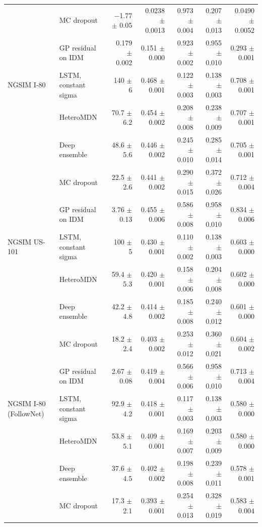 \begin{table}[htbp]
\begin{tabular}{llrrrrr}
 & MC dropout & $-$1.77 $\pm$ 0.05 & 0.0238 $\pm$ 0.0013 & 0.973 $\pm$ 0.004 & 0.207 $\pm$ 0.013 & 0.0490 $\pm$ 0.0052 \\
 & GP residual on IDM & 0.179 $\pm$ 0.002 & 0.151 $\pm$ 0.000 & 0.923 $\pm$ 0.002 & 0.955 $\pm$ 0.010 & 0.293 $\pm$ 0.001 \\
\midrule
NGSIM I-80 & LSTM, constant sigma & 140 $\pm$ 6 & 0.468 $\pm$ 0.001 & 0.122 $\pm$ 0.003 & 0.138 $\pm$ 0.003 & 0.708 $\pm$ 0.001 \\
 & HeteroMDN & 70.7 $\pm$ 6.2 & 0.454 $\pm$ 0.002 & 0.208 $\pm$ 0.008 & 0.238 $\pm$ 0.009 & 0.707 $\pm$ 0.001 \\
 & Deep ensemble & 48.6 $\pm$ 5.6 & 0.446 $\pm$ 0.002 & 0.245 $\pm$ 0.010 & 0.285 $\pm$ 0.014 & 0.705 $\pm$ 0.001 \\
 & MC dropout & 22.5 $\pm$ 2.6 & 0.441 $\pm$ 0.002 & 0.290 $\pm$ 0.015 & 0.372 $\pm$ 0.026 & 0.712 $\pm$ 0.004 \\
 & GP residual on IDM & 3.76 $\pm$ 0.13 & 0.455 $\pm$ 0.006 & 0.586 $\pm$ 0.008 & 0.958 $\pm$ 0.010 & 0.834 $\pm$ 0.006 \\
\midrule
NGSIM US-101 & LSTM, constant sigma & 100 $\pm$ 5 & 0.430 $\pm$ 0.001 & 0.110 $\pm$ 0.002 & 0.138 $\pm$ 0.003 & 0.603 $\pm$ 0.000 \\
 & HeteroMDN & 59.4 $\pm$ 5.3 & 0.420 $\pm$ 0.001 & 0.158 $\pm$ 0.006 & 0.204 $\pm$ 0.008 & 0.602 $\pm$ 0.000 \\
 & Deep ensemble & 42.2 $\pm$ 4.8 & 0.414 $\pm$ 0.002 & 0.185 $\pm$ 0.008 & 0.240 $\pm$ 0.012 & 0.601 $\pm$ 0.000 \\
 & MC dropout & 18.2 $\pm$ 2.4 & 0.403 $\pm$ 0.002 & 0.253 $\pm$ 0.012 & 0.360 $\pm$ 0.021 & 0.604 $\pm$ 0.002 \\
 & GP residual on IDM & 2.67 $\pm$ 0.08 & 0.419 $\pm$ 0.004 & 0.566 $\pm$ 0.006 & 0.958 $\pm$ 0.010 & 0.713 $\pm$ 0.004 \\
\midrule
NGSIM I-80 (FollowNet) & LSTM, constant sigma & 92.9 $\pm$ 4.2 & 0.418 $\pm$ 0.001 & 0.117 $\pm$ 0.003 & 0.138 $\pm$ 0.003 & 0.580 $\pm$ 0.000 \\
 & HeteroMDN & 53.8 $\pm$ 5.1 & 0.409 $\pm$ 0.001 & 0.169 $\pm$ 0.007 & 0.203 $\pm$ 0.009 & 0.580 $\pm$ 0.000 \\
 & Deep ensemble & 37.6 $\pm$ 4.5 & 0.402 $\pm$ 0.002 & 0.198 $\pm$ 0.008 & 0.239 $\pm$ 0.011 & 0.578 $\pm$ 0.001 \\
 & MC dropout & 17.3 $\pm$ 2.1 & 0.393 $\pm$ 0.001 & 0.254 $\pm$ 0.013 & 0.328 $\pm$ 0.019 & 0.583 $\pm$ 0.004 \\

\end{tabular}
\end{table}
